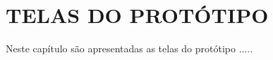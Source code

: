 \chapter{TELAS DO PROTÓTIPO} \label{telas}

Neste capítulo são apresentadas as telas do protótipo .....


